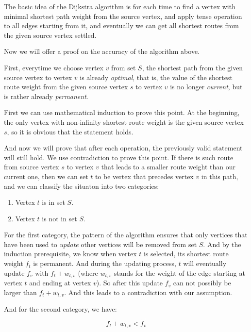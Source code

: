 \documentclass[a4paper,11pt,twocolumn]{article}
\begin{document}
The basic idea of the Dijkstra algorithm is for each time to find a vertex with minimal shortest path weight from the source vertex, and apply tense operation to all edges starting from it, and eventually we can get all shortest routes from the given source vertex settled. 

Now we will offer a proof on the accuracy of the algorithm above. 

First, everytime we choose vertex $v$ from set $S$, the shortest path from the given source vertex to vertex $v$ is already \emph{optimal}, that is, the value of the shortest route weight from the given source vertex $s$ to vertex $v$ is no longer \emph{current}, but is rather already \emph{permanent}. 

First we can use mathematical induction to prove this point. At the beginning, the only vertex with non-infinity shortest route weight is the given source vertex $s$, so it is obvious that the statement holds. 

And now we will prove that after each operation, the previously valid statement will still hold. We use contradiction to prove this point. If there is such route from source vertex $s$ to vertex $v$ that leads to a smaller route weight than our current one, then we can set $t$ to be vertex that precedes vertex $v$ in this path, and we can classify the situaton into two categories: 

\begin{enumerate}

\item{Vertex $t$ is in set $S$. }
\item{Vertex $t$ is not in set $S$. }

\end{enumerate}

For the first category, the pattern of the algorithm ensures that only vertices that have been used to \emph{update} other vertices will be removed from set $S$. And by the induction prerequisite, we know when vertex $t$ is selected, its shortest route weight $f_t$ is permanent. And during the updating process, $t$ will eventually update $f_v$ with $f_t + w_{t,v}$ (where $w_{t,v}$ stands for the weight of the edge starting at vertex $t$ and ending at vertex $v$). So after this update $f_v$ can not possibly be larger than $f_t + w_{t,v}$. And this leads to a contradiction with our assumption. 

And for the second category, we have:

\begin{equation}
f_t+w_{t,v}<f_v\label{cont}
\end{equation}
\end{document}
